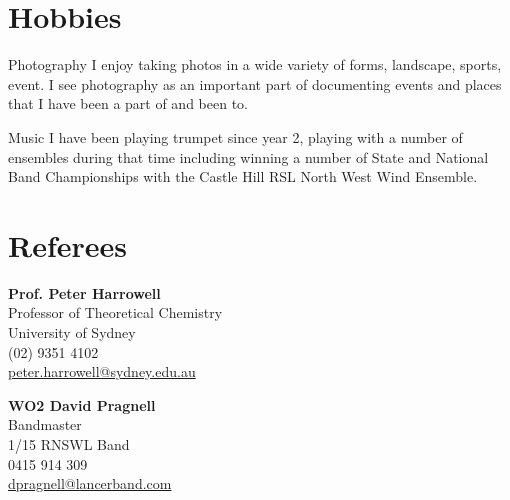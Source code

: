 \documentclass{friggeri-cv} %
\begin{document}

\section{Hobbies}

\begin{entrylist}

\entry
{}
{Photography}
{}
{I enjoy taking photos in a wide variety of forms, landscape, sports, event. I see photography as an important part of documenting events and places that I have been a part of and been to.}

\entry
{}
{Music}
{}
{I have been playing trumpet since year 2, playing with a number of ensembles during that time including winning a number of State and National Band Championships with the Castle Hill RSL North West Wind Ensemble.}

\end{entrylist}

\pagebreak
\section{Referees}
\begin{minipage}[t]{0.5\textwidth}

{\bf Prof. Peter Harrowell}\\
Professor of Theoretical Chemistry\\
University of Sydney\\
(02) 9351 4102\\
\href{mailto:peter.harrowell@sydney.edu.au}{peter.harrowell@sydney.edu.au}
\end{minipage}
\begin{minipage}[t]{0.5\textwidth}
{\bf WO2 David Pragnell}\\
Bandmaster\\
1/15 RNSWL Band\\
0415 914 309\\
\href{mailto:dpragnell@lancerband.com}{dpragnell@lancerband.com}
\end{minipage}
\end{document}
